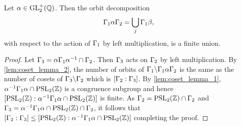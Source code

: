       \begin{proposition}\label{prop:double_congruence_subgroup_coset_decomposition_is_finite}
        Let $\alpha \in \mathrm{GL}_{2}^{+}(\mathbb{Q})$. Then the orbit decomposition
        \[
          \Gamma_{1}\alpha\Gamma_{2} = \bigcup_{j}\Gamma_{1}\beta,
        \]
        with respect to the action of $\Gamma_{1}$ by left multiplication, is a finite union.
      \end{proposition}
      \begin{proof}
        Let $\Gamma_{3} = \alpha\Gamma_{1}\alpha^{-1} \cap \Gamma_{2}$. Then $\Gamma_{3}$ acts on $\Gamma_{2}$ by left multiplication. By \cref{lem:coset_lemma_2}, the number of orbits of $\Gamma_{1}\backslash\Gamma_{1}\alpha\Gamma_{2}$ is the same as the number of cosets of $\Gamma_{3}\backslash\Gamma_{2}$ which is $[\Gamma_{2}:\Gamma_{3}]$. By \cref{lem:coset_lemma_1}, $\alpha^{-1}\Gamma_{1}\alpha \cap \mathrm{PSL}_{2}(\mathbb{Z})$ is a congruence subgroup and hence $[\mathrm{PSL}_{2}(\mathbb{Z}):\alpha^{-1}\Gamma_{1}\alpha \cap \mathrm{PSL}_{2}(\mathbb{Z})]$ is finite. As $\Gamma_{2} = \mathrm{PSL}_{2}(\mathbb{Z}) \cap \Gamma_{2}$ and $\Gamma_{3} = \alpha^{-1}\Gamma_{1}\alpha \cap \mathrm{PSL}_{2}(\mathbb{Z}) \cap \Gamma_{2}$, it follows that $[\Gamma_{2}:\Gamma_{3}] \le [\mathrm{PSL}_{2}(\mathbb{Z}):\alpha^{-1}\Gamma_{1}\alpha \cap \mathrm{PSL}_{2}(\mathbb{Z})]$ completing the proof.
      \end{proof}

